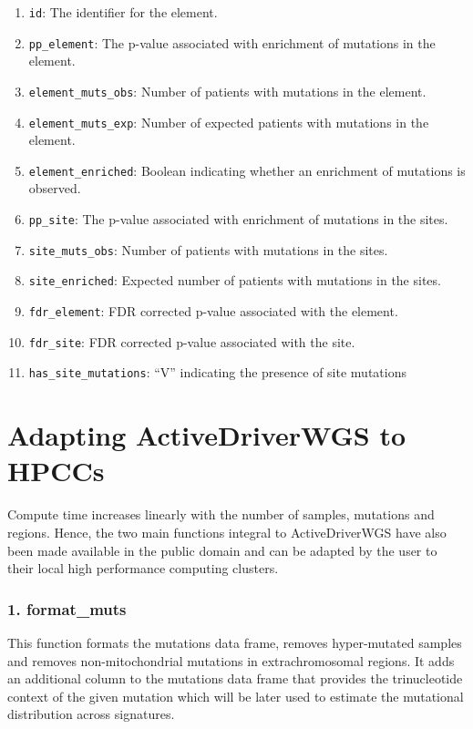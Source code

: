 \documentclass[]{article}
\begin{document}
\begin{enumerate}
\def\labelenumi{\arabic{enumi})}
\item
  \texttt{id}: The identifier for the element.
\item
  \texttt{pp\_element}: The p-value associated with enrichment of
  mutations in the element.
\item
  \texttt{element\_muts\_obs}: Number of patients with mutations in the
  element.
\item
  \texttt{element\_muts\_exp}: Number of expected patients with
  mutations in the element.
\item
  \texttt{element\_enriched}: Boolean indicating whether an enrichment
  of mutations is observed.
\item
  \texttt{pp\_site}: The p-value associated with enrichment of mutations
  in the sites.
\item
  \texttt{site\_muts\_obs}: Number of patients with mutations in the
  sites.
\item
  \texttt{site\_enriched}: Expected number of patients with mutations in
  the sites.
\item
  \texttt{fdr\_element}: FDR corrected p-value associated with the
  element.
\item
  \texttt{fdr\_site}: FDR corrected p-value associated with the site.
\item
  \texttt{has\_site\_mutations}: ``V'' indicating the presence of site
  mutations
\end{enumerate}

\section{Adapting ActiveDriverWGS to
HPCCs}\label{adapting-activedriverwgs-to-hpccs}

Compute time increases linearly with the number of samples, mutations
and regions. Hence, the two main functions integral to ActiveDriverWGS
have also been made available in the public domain and can be adapted by
the user to their local high performance computing clusters.

\subsubsection{1. format\_muts}\label{format_muts}

This function formats the mutations data frame, removes hyper-mutated
samples and removes non-mitochondrial mutations in extrachromosomal
regions. It adds an additional column to the mutations data frame that
provides the trinucleotide context of the given mutation which will be
later used to estimate the mutational distribution across signatures.
\end{document}

